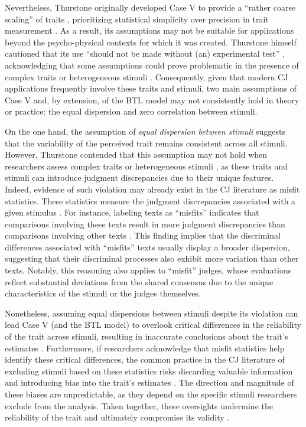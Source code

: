 \documentclass[
  authoryear,
  preprint,
  1p]{elsarticle}
\begin{document}
Nevertheless, Thurstone originally developed Case V to provide a
``rather coarse scaling'' of traits \citep[pp.~269]{Thurstone_1927b},
prioritizing statistical simplicity over precision in trait measurement
\citep[pp.~677]{Kelly_et_al_2022}. As a result, its assumptions may not
be suitable for applications beyond the psycho-physical contexts for
which it was created. Thurstone himself cautioned that its use ``should
not be made without (an) experimental test''
\citep[pp.~270]{Thurstone_1927b}, acknowledging that some assumptions
could prove problematic in the presence of complex traits or
heterogeneous stimuli \citep[pp.~376]{Thurstone_1927a}. Consequently,
given that modern CJ applications frequently involve these traits and
stimuli, two main assumptions of Case V and, by extension, of the BTL
model may not consistently hold in theory or practice: the equal
dispersion and zero correlation between stimuli.

On the one hand, the assumption of \emph{equal dispersion between
stimuli} suggests that the variability of the perceived trait remains
consistent across all stimuli. However, Thurstone contended that this
assumption may not hold when researchers assess complex traits or
heterogeneous stimuli \citep[pp.~376]{Thurstone_1927a}, as these traits
and stimuli can introduce judgment discrepancies due to their unique
features. Indeed, evidence of such violation may already exist in the CJ
literature as misfit statistics. These statistics measure the judgment
discrepancies associated with a given stimulus
\citetext{\citealp[pp.~12]{Pollitt_2004}; \citealp[pp.~20]{Goossens_et_al_2018}}.
For instance, labeling texts as ``misfits'' indicates that comparisons
involving these texts result in more judgment discrepancies than
comparisons involving other texts
\citep{Pollitt_2012a, Pollitt_2012b, vanDaal_et_al_2016, Goossens_et_al_2018}.
This finding implies that the discriminal differences associated with
``misfits'' texts usually display a broader dispersion, suggesting that
their discriminal processes also exhibit more variation than other
texts. Notably, this reasoning also applies to ``misfit'' judges, whose
evaluations reflect substantial deviations from the shared consensus due
to the unique characteristics of the stimuli or the judges themselves.

Nonetheless, assuming equal dispersions between stimuli despite its
violation can lead Case V (and the BTL model) to overlook critical
differences in the reliability of the trait across stimuli, resulting in
inaccurate conclusions about the trait's estimates
\citep[pp.~370]{McElreath_2020}. Furthermore, if researchers acknowledge
that misfit statistics help identify these critical differences, the
common practice in the CJ literature of excluding stimuli based on these
statistics
\citep{Pollitt_2012b, vanDaal_et_al_2017, Goossens_et_al_2018} risks
discarding valuable information and introducing bias into the trait's
estimates \citep[chap.~12]{Zimmerman_1994, McElreath_2020}. The
direction and magnitude of these biases are unpredictable, as they
depend on the specific stimuli researchers exclude from the analysis.
Taken together, these oversights undermine the reliability of the trait
and ultimately compromise its validity \citep[pp.~2]{Perron_et_al_2015}.
\end{document}
